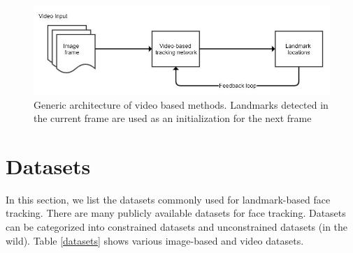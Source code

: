 \documentclass{llncs}
\begin{document}
\begin{figure}[h!]

\includegraphics[scale=0.5]{Media/generic_video_based}
\caption{Generic architecture of video based methods. Landmarks detected in the current frame are used as an initialization for the next frame}
\label{generic_video_based}
\end{figure}

\section{Datasets}

In this section, we list the datasets commonly used for landmark-based face tracking. There are many publicly available datasets for face tracking. Datasets can be categorized into constrained datasets and unconstrained datasets (in the wild).
Table \textcolor{red}{\ref{datasets}} shows various image-based and video datasets.
\end{document}
